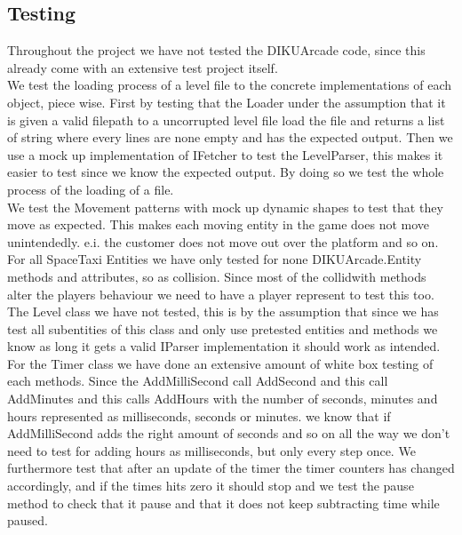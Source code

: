 \documentclass[../master.tex]{subfiles}
\begin{document}
\subsection{Testing}
Throughout the project we have not tested the DIKUArcade code, since this already come with an extensive test project itself.
\\[10pt]
We test the loading process of a level file to the concrete implementations of each object, piece wise.
First by testing that the Loader under the assumption that it is given a valid filepath to a uncorrupted level file load the file and returns a list of string where every lines are none empty and has the expected output. Then we use a mock up implementation of IFetcher to test the LevelParser, this makes it easier to test since we know the expected output. By doing so we test the whole process of the loading of a file.
\\[10pt]
We test the Movement patterns with mock up dynamic shapes to test that they move as expected. This makes each moving entity in the game does not move unintendedly. e.i. the customer does not move out over the platform and so on.
\\[10pt]
For all SpaceTaxi Entities we have only tested for none DIKUArcade.Entity methods and attributes, so as collision. Since most of the collidwith methods alter the players behaviour we need to have a player represent to test this too.
\\[10pt]
The Level class we have not tested, this is by the assumption that since we has test all subentities of this class and only use pretested entities and methods we know as long it gets a valid IParser implementation it should work as intended.
\\[10pt]
For the Timer class we have done an extensive amount of white box testing of each methods. Since the AddMilliSecond call AddSecond and this call AddMinutes and this calls AddHours with the number of seconds, minutes and hours represented as milliseconds, seconds or minutes. we know that if AddMilliSecond adds the right amount of seconds and so on all the way we don't need to test for adding hours as milliseconds, but only every step once. We furthermore test that after an update of the timer the timer counters has changed accordingly, and if the times hits zero it should stop and we test the pause method to check that it pause and that it does not keep subtracting time while paused.
\end{document}
